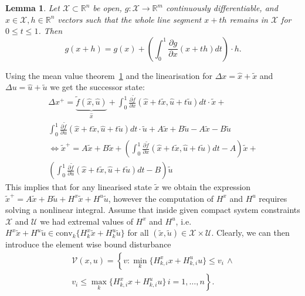 \documentclass[letterpaper, 10pt, conference]{ieeeconf} %
\newtheorem{thm}{Lemma}[section]
\providecommand{\conv}{\text{conv}}
\begin{document}
%
%
\begin{thm}\label{thm:mean:value:theorem}
Let $\mathcal X\subset\mathbb R^n$ be open, $g : \mathcal X \rightarrow\mathbb R^m$ continuously differentiable, 
and $x \in\mathcal X, h \in\mathbb R^n$ vectors such that the 
whole line segment $x + th$ remains in $\mathcal X$ for $0 \leq t \leq 1$. Then
\begin{equation}
	g(x+h) = g(x) + \left(\int_0^1 \frac{\partial g}{\partial x}(x+th)dt\right)\cdot h.
\end{equation}
\end{thm}
%
%
Using the mean value theorem~\ref{thm:mean:value:theorem}
and the linearisation for $\Delta x = \hat x + \tilde x$ and $\Delta u = \hat u + \tilde u$ we
get the successor state:
%
\begin{equation}
	\begin{split}
	\Delta x^+ = \underbrace{\tilde f(\hat x, \hat u)}_{\hat x} + \int_0^1\frac{\partial\tilde 
	f}{\partial x}(\hat x + t\tilde x
	,\hat u + t\tilde u)dt\cdot \tilde x +\\
	 \int_0^1\frac{\partial\tilde f}{\partial u}(\hat x + t\tilde x
	,\hat u + t\tilde u)dt\cdot \tilde u + A \tilde x + B \tilde u - A \tilde x - B\tilde u\\
	\Leftrightarrow \tilde x^+ = A\tilde x + B \tilde x +\left(
	\int_0^1\frac{\partial\tilde f}{\partial x}(\hat x + t\tilde x,\hat u + t\tilde u)dt - A
	\right)\tilde x + \\ \left(
	\int_0^1\frac{\partial\tilde f}{\partial u}(\hat x + t\tilde x,\hat u + t\tilde u)dt - B
	\right)\tilde u
	\end{split}
\end{equation}
%
This implies that for any linearised state $\tilde x$ we obtain the expression
$\tilde x^+ = A\tilde x+B\tilde u + H^x\tilde x + H^u \tilde u$, however the computation
of $H^x$ and $H^u$ requires solving a nonlinear integral. Assume that inside given compact system
constraints $\mathcal X$ and $\mathcal U$ we had extremal values of $H^x$ and $H^u$, i.e.
$H^x\tilde x+H^u\tilde u\in\conv_k\{H^x_k\tilde x + H^u_k\tilde u\}$ for all $(\tilde x,\tilde u)\in\mathcal X\times \mathcal U$.
Clearly, we can then introduce the element wise bound disturbance 
%
\begin{equation}\label{eq:definition:element:wise:constraints:on:nonlinearities}
\begin{split}
\mathcal V(x,u)=\left\{v:\min_k\{
H^x_{k,i}x+H^u_{k,i}u\}\leq v_i\,\wedge\right. \\ \left.v_i \leq \max_k\{H^x_{k,i}x+H^u_{k,i}u\}\, i =1,\dots,n\right\}.
\end{split}
\end{equation}
\end{document}
